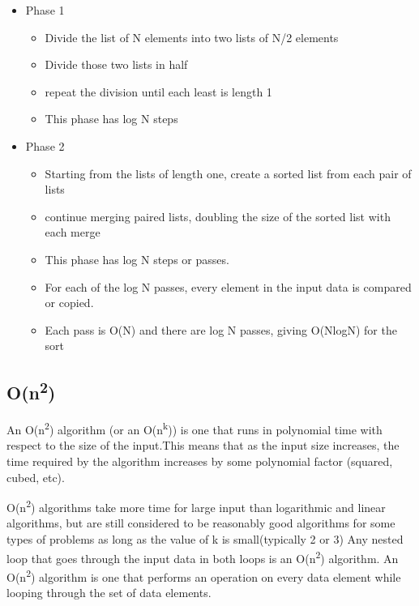 \begin{itemize}
\item Phase 1
\begin{itemize}
\item Divide the list of N elements into two lists of N/2 elements
\item Divide those two lists in half
\item repeat the division until each least is length 1
\item This phase has log N steps
\end{itemize}
\item Phase 2
\begin{itemize}
\item Starting from the lists of length one, create a sorted list from each pair of lists
\item continue merging paired lists, doubling the size of the sorted list with each merge
\item This phase has log N steps or passes.   
\item For each of the log N passes,  every element in the input data is compared or copied.   
\item Each pass is O(N) and there are log N passes, giving O(NlogN) for the sort
\end{itemize}
\end{itemize}





\subsection{O(n\textsuperscript{2})}

An O(n\textsuperscript{2}) algorithm (or an
O(n\textsuperscript{k})) is one that runs in polynomial time with
respect to the size of the input.This means that as the input size
increases, the time required by the algorithm increases by some
polynomial factor (squared, cubed, etc).

O(n\textsuperscript{2}) algorithms take more time for
large input than logarithmic and linear algorithms, but are still
considered to be reasonably good algorithms for some types of problems as long as the value of k is small(typically 2 or 3)
Any nested loop that goes through the input data in both loops is an
O(n\textsuperscript{2}) algorithm.
An O(n\textsuperscript{2})
algorithm is one that performs an operation on every data element while looping through the set of data elements.  

